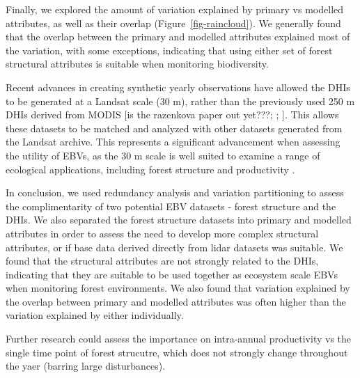 \documentclass[
  authoryear,
  review,
  3p,
  twocolumn]{elsarticle}
\begin{document}
Finally, we explored the amount of variation explained by primary vs
modelled attributes, as well as their overlap
(Figure~\ref{fig-raincloud}). We generally found that the overlap
between the primary and modelled attributes explained most of the
variation, with some exceptions, indicating that using either set of
forest structural attributes is suitable when monitoring biodiversity.

Recent advances in creating synthetic yearly observations have allowed
the DHIs to be generated at a Landsat scale (30 m), rather than the
previously used 250 m DHIs derived from MODIS {[}is the razenkova paper
out yet???; \citet{radeloff2019}; \citet{razenkova2022}{]}. This allows
these datasets to be matched and analyzed with other datasets generated
from the Landsat archive. This represents a significant advancement when
assessing the utility of EBVs, as the 30 m scale is well suited to
examine a range of ecological applications, including forest structure
and productivity \citep{cohen2004}.

In conclusion, we used redundancy analysis and variation partitioning to
assess the complimentarity of two potential EBV datasets - forest
structure and the DHIs. We also separated the forest structure datasets
into primary and modelled attributes in order to assess the need to
develop more complex structural attributes, or if base data derived
directly from lidar datasets was suitable. We found that the structural
attributes are not strongly related to the DHIs, indicating that they
are suitable to be used together as ecosystem scale EBVs when monitoring
forest environments. We also found that variation explained by the
overlap between primary and modelled attributes was often higher than
the variation explained by either individually.

Further research could assess the importance on intra-annual
productivity vs the single time point of forest strucutre, which does
not strongly change throughout the yaer (barring large disturbances).

\newpage


\renewcommand\refname{References}
  
\end{document}
